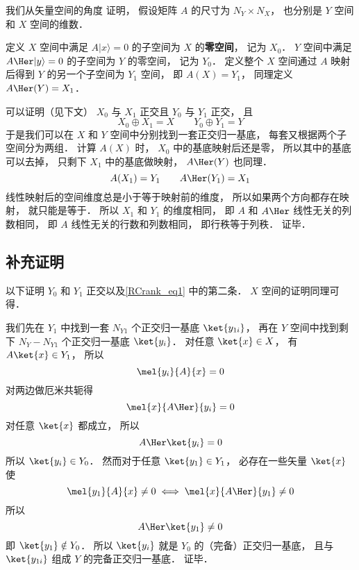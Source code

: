 

我们从矢量空间的角度 证明， 假设矩阵 $A$ 的尺寸为 $N_Y \times N_X$， 也分别是 $Y$ 空间和 $X$ 空间的维数．

定义 $X$ 空间中满足 $A |x\rangle = 0$ 的子空间为 $X$ 的\textbf{零空间}， 记为 $X_0$． $Y$ 空间中满足 $A\Her |y\rangle = 0$ 的子空间为 $Y$ 的零空间， 记为 $Y_0$． 定义整个 $X$ 空间通过 $A$ 映射后得到 $Y$ 的另一个子空间为 $Y_1$ 空间， 即 $A(X) = Y_1$， 同理定义 $A\Her(Y) = X_1$． %

可以证明（见下文） $X_0$ 与 $X_1$ 正交且 $Y_0$ 与 $Y_1$ 正交， 且
\begin{equation}\label{RCrank_eq1}
X_0 \oplus X_1 = X
\qquad
Y_0 \oplus Y_1 = Y
\end{equation}
于是我们可以在 $X$ 和 $Y$ 空间中分别找到一套正交归一基底， 每套又根据两个子空间分为两组． 计算 $A(X)$ 时， $X_0$ 中的基底映射后还是零， 所以其中的基底可以去掉， 只剩下 $X_1$ 中的基底做映射， $A\Her(Y)$ 也同理．
\begin{equation}
A(X_1) = Y_1
\qquad
A\Her(Y_1) = X_1
\end{equation}
线性映射后的空间维度总是小于等于映射前的维度， 所以如果两个方向都存在映射， 就只能是等于． 所以 $X_1$ 和 $Y_1$ 的维度相同， 即 $A$ 和 $A\Her$ 线性无关的列数相同， 即 $A$ 线性无关的行数和列数相同， 即行秩等于列秩． 证毕．

\subsection{补充证明}
以下证明 $Y_0$ 和 $Y_1$ 正交以及\autoref{RCrank_eq1} 中的第二条． $X$ 空间的证明同理可得．

我们先在 $Y_1$ 中找到一套 $N_{Y1}$ 个正交归一基底 $\ket{y_{1i}}$， 再在 $Y$ 空间中找到剩下 $N_Y - N_{Y1}$ 个正交归一基底 $\ket{y_i}$． 对任意 $\ket{x} \in X$， 有 $A \ket{x} \in Y_1$， 所以
\begin{equation}
\mel{y_i}{A}{x} = 0
\end{equation}
对两边做厄米共轭得%
\begin{equation}
\mel{x}{A\Her}{y_i} = 0
\end{equation}
对任意 $\ket{x}$ 都成立， 所以
\begin{equation}
A\Her\ket{y_i} = 0
\end{equation}
所以 $\ket{y_i} \in Y_0$． 然而对于任意 $\ket{y_1} \in Y_1$， 必存在一些矢量 $\ket{x}$ 使
\begin{equation}
\mel{y_1}{A}{x} \ne 0
\iff
\mel{x}{A\Her}{y_1} \ne 0
\end{equation}
所以
\begin{equation}
A\Her\ket{y_1} \ne 0
\end{equation}
即 $\ket{y_1} \notin Y_0$． 所以 $\ket{y_i}$ 就是 $Y_0$ 的（完备）正交归一基底， 且与 $\ket{y_{1i}}$ 组成 $Y$ 的完备正交归一基底． 证毕．
